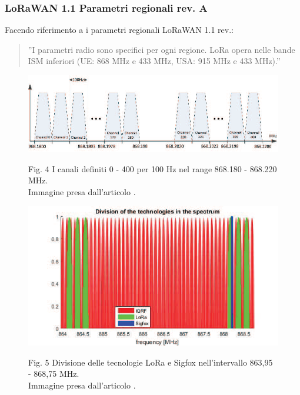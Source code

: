 \documentclass[a4paper]{report} %
\begin{document}
\subsubsection{LoRaWAN 1.1 Parametri regionali rev. A}
Facendo riferimento a \cite{art:rif.29} i parametri regionali LoRaWAN 1.1 rev.:
\begin{quote}
	''I parametri radio sono specifici per ogni regione. LoRa opera nelle bande ISM inferiori (UE: 868 MHz e 433 MHz, USA: 915 MHz e 433 MHz).''
\end{quote}
\begin{figure}
\centering
\includegraphics[scale=.5]{Immagini/DivisioneBande.png}

Fig. 4 I canali definiti 0 - 400 per 100 Hz nel range 868.180 - 868.220 MHz.\\ %
Immagine presa dall'articolo \cite{art:rif.46}.
\end{figure}

\begin{figure}
\centering
\includegraphics[scale=.5]{Immagini/DivB.png}

Fig. 5 Divisione delle tecnologie LoRa e Sigfox nell'intervallo 863,95 - 868,75 MHz.\\ %
Immagine presa dall'articolo \cite{art:rif.46}.
\end{figure}
\end{document}
